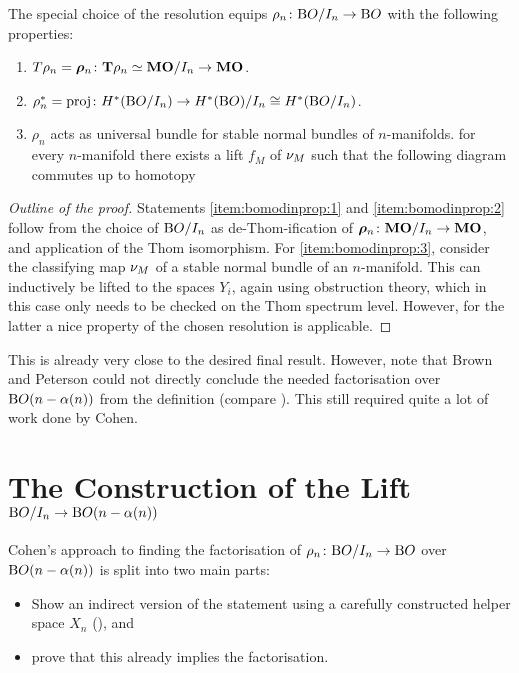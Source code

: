 \begin{Thm*}
  The special choice of the resolution equips
  $\rho_n\colon\mathrm{B}O/I_{n}\to\mathrm{B}O$ with the following properties:
  \begin{enumerate}
  \item\label{item:bomodinprop:1}
    $T{\rho_n} = \bm{\rho}_n\colon \bm{\mathrm{T}}{\rho_n}\simeq\bm{\mathrm{MO}}/I_{n}\to\bm{\mathrm{MO}}$.
  \item\label{item:bomodinprop:2}
    ${\rho}^*_n=\mathrm{proj}\colon
    H^*(\mathrm{B}O/I_{n}) \to H^*(\mathrm{B}O)/I_{n}\cong H^*(\mathrm{B}O/I_{n})$.
  \item\label{item:bomodinprop:3}
    $\rho_n$ acts as universal bundle for stable normal bundles of
    $n$-manifolds.
    \Idest for every $n$-manifold there exists a lift $f_M$ of
    $\nu_{M}$ 
    such that the following diagram commutes up to homotopy
    \begin{center}
    \end{center}
  \end{enumerate}
  \begin{proof}[Outline of the proof]
    Statements \ref{item:bomodinprop:1} and \ref{item:bomodinprop:2}
    follow from the choice of $\mathrm{B}O/I_{n}$ as de-Thom-ification of
    $\bm{\rho}_n\colon\bm{\mathrm{MO}}/I_{n}\to\bm{\mathrm{MO}}$, and application of the Thom
    isomorphism.
    For \ref{item:bomodinprop:3}, consider the classifying map $\nu_{M}$
    of a stable normal bundle of an $n$-manifold. This can inductively
    be lifted to the spaces $Y_i$, again
    using obstruction theory,
    which in this case only needs to be checked on the Thom spectrum
    level. However, for the latter a nice property of the chosen
    resolution is applicable.
  \end{proof}
\end{Thm*}

This is already very close to the desired final result.
However, note that Brown and Peterson could not directly conclude the
needed factorisation over $\mathrm{B}O(n-\alpha(n))$ from the definition
(compare \cite{brownpeterson}).
This still required quite a lot of work done by Cohen.


\section*{The Construction of the Lift $\mathrm{B}O/I_{n}\to\mathrm{B}O(n-\alpha(n))$}
Cohen's approach to finding the factorisation of
$\rho_n\colon\mathrm{B}O/I_{n}\to\mathrm{B}O$ over $\mathrm{B}O(n-\alpha(n))$ is split into two
main parts:
\begin{itemize}
\item Show an indirect version of the statement using a carefully
  constructed helper space $X_n$ (\cite[Lemma~B]{cohen}), and
\item prove that this already implies the factorisation.
\end{itemize}

